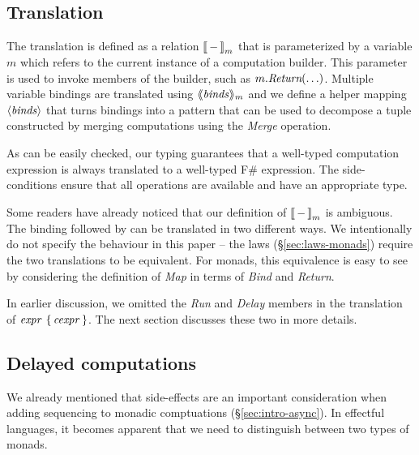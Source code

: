 \documentclass[runningheads,a4paper]{llncs}
\begin{document}

\subsection{Translation}
\label{sec:semantics-transl}

The translation is defined as a relation $|[ \,-\, |]_m$ that is parameterized by a variable $m$ which
refers to the current instance of a computation builder. This parameter is used 
to invoke members of the builder, such as $m.\emph{Return}(\ldots)$. Multiple 
variable bindings are translated using $\langle\hspace{-0.25em}\langle \textnormal{\emph{binds}} \rangle\hspace{-0.25em}\rangle_m$ and we define a helper mapping 
$\langle \textnormal{\emph{binds}} \rangle$ that turns bindings into a pattern that can be used to decompose a tuple
constructed by merging computations using the \emph{Merge} operation.

As can be easily checked, our typing guarantees that a well-typed computation expression
is always translated to a well-typed F\# expression. The side-conditions ensure that all
operations are available and have an appropriate type.

Some readers have already noticed that our definition of $|[ \,-\, |]_m$ is ambiguous. The 
 binding followed by  can be translated in two different ways. 
We intentionally do not specify the behaviour in this paper -- the laws (\S\ref{sec:laws-monads})
require the two translations to be equivalent. For monads, this equivalence is easy to see 
by considering the definition of \emph{Map} in terms of \emph{Bind} and \emph{Return}.

In earlier discussion, we omitted the \emph{Run} and \emph{Delay} members in the translation of
$\textnormal{\emph{expr}}~\{\,\textnormal{\emph{cexpr}}\,\}$. The next section discusses these two in more details.


\subsection{Delayed computations}
\label{sec:semantics-delayed}

We already mentioned that side-effects are an important consideration when adding sequencing to
monadic comptuations (\S\ref{sec:intro-async}). 
In effectful languages, it becomes apparent that we need to distinguish 
between two types of monads. 
\end{document}
